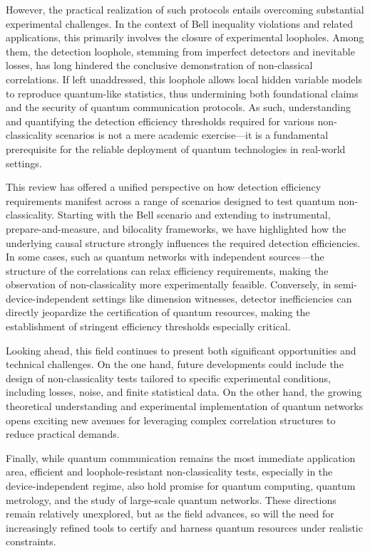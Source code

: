 \documentclass[aps,pra,reprint, superscriptaddress,showkeys]{revtex4-2}
\theoremstyle{plain}
\begin{document}
However, the practical realization of such protocols entails overcoming substantial experimental challenges. In the context of Bell inequality violations and related applications, this primarily involves the closure of experimental loopholes. Among them, the detection loophole, stemming from imperfect detectors and inevitable losses, has long hindered the conclusive demonstration of non-classical correlations. If left unaddressed, this loophole allows local hidden variable models to reproduce quantum-like statistics, thus undermining both foundational claims and the security of quantum communication protocols. As such, understanding and quantifying the detection efficiency thresholds required for various non-classicality scenarios is not a mere academic exercise—it is a fundamental prerequisite for the reliable deployment of quantum technologies in real-world settings.

This review has offered a unified perspective on how detection efficiency requirements manifest across a range of scenarios designed to test quantum non-classicality. Starting with the Bell scenario and extending to instrumental, prepare-and-measure, and bilocality frameworks, we have highlighted how the underlying causal structure strongly influences the required detection efficiencies. In some cases, such as quantum networks with independent sources—the structure of the correlations can relax efficiency requirements, making the observation of non-classicality more experimentally feasible. Conversely, in semi-device-independent settings like dimension witnesses, detector inefficiencies can directly jeopardize the certification of quantum resources, making the establishment of stringent efficiency thresholds especially critical.

Looking ahead, this field continues to present both significant opportunities and technical challenges. On the one hand, future developments could include the design of non-classicality tests tailored to specific experimental conditions, including losses, noise, and finite statistical data. On the other hand, the growing theoretical understanding and experimental implementation of quantum networks opens exciting new avenues for leveraging complex correlation structures to reduce practical demands.

Finally, while quantum communication remains the most immediate application area, efficient and loophole-resistant non-classicality tests, especially in the device-independent regime, also hold promise for quantum computing, quantum metrology, and the study of large-scale quantum networks. These directions remain relatively unexplored, but as the field advances, so will the need for increasingly refined tools to certify and harness quantum resources under realistic constraints.
\end{document}

